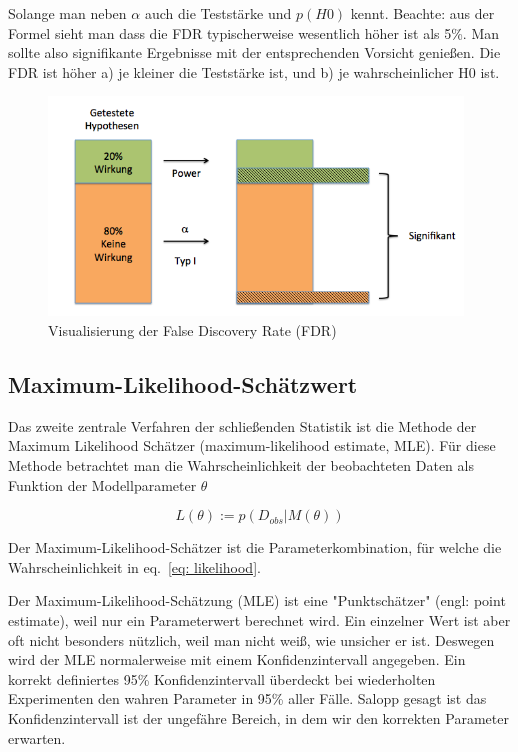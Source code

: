 \documentclass[a4paper,twoside]{tufte-book}\usepackage[]{graphicx}\usepackage[]{color}
\begin{document}
Solange man neben $\alpha$ auch die Teststärke und $p(H0)$ kennt. Beachte: aus der Formel sieht man dass die FDR typischerweise wesentlich höher ist als 5\%. Man sollte also signifikante Ergebnisse mit der entsprechenden Vorsicht genießen. Die FDR ist höher a) je kleiner die Teststärke ist, und b) je wahrscheinlicher H0 ist. 



\begin{figure}[htb]
\begin{center}
\includegraphics[width = 11cm]{FDR}
\caption{Visualisierung der False Discovery Rate (FDR)}
\label{fig: FDR}
\end{center}
\end{figure}


\subsection{Maximum-Likelihood-Schätzwert}

Das zweite zentrale Verfahren der schließenden Statistik ist die Methode der Maximum Likelihood Schätzer (maximum-likelihood estimate, MLE). Für diese Methode betrachtet man die Wahrscheinlichkeit der beobachteten Daten als Funktion der Modellparameter $\theta$ 

\begin{equation}\label{eq: likelihood}
L(\theta) := p(D_{obs} | M(\theta))
\end{equation}

Der Maximum-Likelihood-Schätzer ist die Parameterkombination, für welche die Wahrscheinlichkeit in eq.~\ref{eq: likelihood}. 

Der Maximum-Likelihood-Schätzung (MLE) ist eine "Punktschätzer" (engl: point estimate), weil nur ein Parameterwert berechnet wird. Ein einzelner Wert ist aber oft nicht besonders nützlich, weil man nicht weiß, wie unsicher er ist. Deswegen wird der MLE normalerweise mit einem Konfidenzintervall angegeben. Ein korrekt definiertes 95\% Konfidenzintervall überdeckt bei wiederholten Experimenten den wahren Parameter in 95\% aller Fälle. Salopp gesagt ist das Konfidenzintervall ist der ungefähre Bereich, in dem wir den korrekten Parameter erwarten. 
\end{document}
